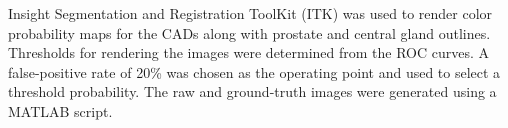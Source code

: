 Insight Segmentation and Registration ToolKit (ITK) was used to render color probability maps for the CADs along with prostate and central gland outlines. Thresholds for rendering the images were determined from the ROC curves. A false-positive rate of 20\% was chosen as the operating point and used to select a threshold probability. The raw and ground-truth images were generated using a MATLAB script.

